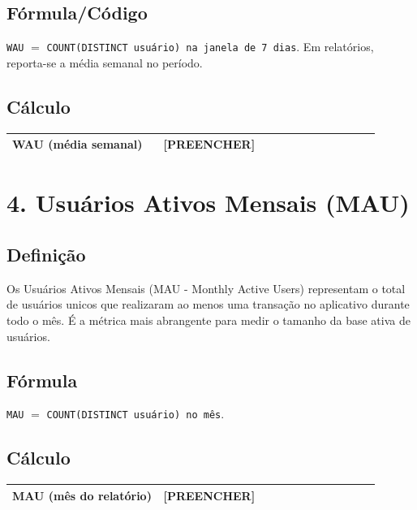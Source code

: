 \documentclass[12pt]{article}
\providecommand{\WAUMedio}{[PREENCHER]}
\providecommand{\MAU}{[PREENCHER]}
\begin{document}
\subsection*{Fórmula/Código}
\noindent \texttt{WAU} $=$ \texttt{COUNT(DISTINCT usuário) na janela de 7 dias}. Em relatórios, reporta-se a média semanal no período.

\subsection*{Cálculo}
\begin{center}
\begin{tabular}{>{\bfseries}p{0.37\linewidth} p{0.53\linewidth}}
\toprule
WAU (média semanal) & \WAUMedio \\
\bottomrule
\end{tabular}
\end{center}

\section*{4. Usuários Ativos Mensais (MAU)}
\subsection*{Definição}
Os Usuários Ativos Mensais (MAU - Monthly Active Users) representam o total de usuários unicos que realizaram ao menos uma transação no aplicativo durante todo o mês. É a métrica mais abrangente para medir o tamanho da base ativa de usuários.

\subsection*{Fórmula}
\noindent \texttt{MAU} $=$ \texttt{COUNT(DISTINCT usuário) no mês}.

\subsection*{Cálculo}
\begin{center}
\begin{tabular}{>{\bfseries}p{0.37\linewidth} p{0.53\linewidth}}
\toprule
MAU (mês do relatório) & \MAU \\
\bottomrule
\end{tabular}
\end{center}
\end{document}
